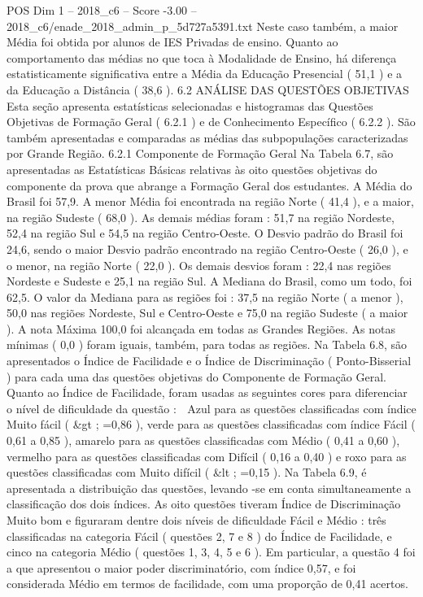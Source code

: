 \begin{textsample}{POS Dim 1 – 2018\_c6 – Score -3.00 – 2018\_c6/enade\_2018\_admin\_p\_5d727a5391.txt}
Neste caso também, a maior Média foi obtida por alunos de IES Privadas de ensino.
Quanto ao comportamento das médias no que toca à Modalidade de Ensino, há diferença estatisticamente significativa entre a Média da Educação Presencial ( 51,1 ) e a da Educação a Distância ( 38,6 ). 6.2 ANÁLISE DAS QUESTÕES OBJETIVAS Esta seção apresenta estatísticas selecionadas e histogramas das Questões Objetivas de Formação Geral ( 6.2.1 ) e de Conhecimento Específico ( 6.2.2 ).
São também apresentadas e comparadas as médias das subpopulações caracterizadas por Grande Região. 6.2.1 Componente de Formação Geral Na Tabela 6.7, são apresentadas as Estatísticas Básicas relativas às oito questões objetivas do componente da prova que abrange a Formação Geral dos estudantes.
A Média do Brasil foi 57,9.
A menor Média foi encontrada na região Norte ( 41,4 ), e a maior, na região Sudeste ( 68,0 ).
As demais médias foram : 51,7 na região Nordeste, 52,4 na região Sul e 54,5 na região Centro-Oeste.
O Desvio padrão do Brasil foi 24,6, sendo o maior Desvio padrão encontrado na região Centro-Oeste ( 26,0 ), e o menor, na região Norte ( 22,0 ).
Os demais desvios foram : 22,4 nas regiões Nordeste e Sudeste e 25,1 na região Sul.
A Mediana do Brasil, como um todo, foi 62,5.
O valor da Mediana para as regiões foi : 37,5 na região Norte ( a menor ), 50,0 nas regiões Nordeste, Sul e Centro-Oeste e 75,0 na região Sudeste ( a maior ).
A nota Máxima 100,0 foi alcançada em todas as Grandes Regiões.
As notas mínimas ( 0,0 ) foram iguais, também, para todas as regiões.
Na Tabela 6.8, são apresentados o Índice de Facilidade e o Índice de Discriminação ( Ponto-Bisserial ) para cada uma das questões objetivas do Componente de Formação Geral.
Quanto ao Índice de Facilidade, foram usadas as seguintes cores para diferenciar o nível de dificuldade da questão :  Azul para as questões classificadas com índice Muito fácil ( \&gt ; =0,86 ), verde para as questões classificadas com índice Fácil ( 0,61 a 0,85 ), amarelo para as questões classificadas com Médio ( 0,41 a 0,60 ), vermelho para as questões classificadas com Difícil ( 0,16 a 0,40 ) e roxo para as questões classificadas com Muito difícil ( \&lt ; =0,15 ).
Na Tabela 6.9, é apresentada a distribuição das questões, levando -se em conta simultaneamente a classificação dos dois índices.
As oito questões tiveram Índice de Discriminação Muito bom e figuraram dentre dois níveis de dificuldade Fácil e Médio : três classificadas na categoria Fácil ( questões 2, 7 e 8 ) do Índice de Facilidade, e cinco na categoria Médio ( questões 1, 3, 4, 5 e 6 ).
Em particular, a questão 4 foi a que apresentou o maior poder discriminatório, com índice 0,57, e foi considerada Médio em termos de facilidade, com uma proporção de 0,41 acertos.

\end{textsample}
